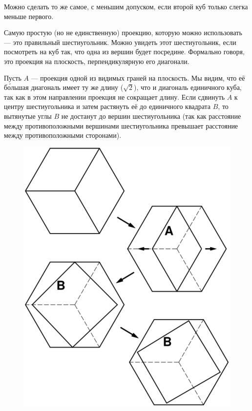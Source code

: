 Можно сделать то же самое, с меньшим допуском, если второй куб только слегка меньше первого.

Самую простую (но не единственную) проекцию, которую можно использовать --- это правильный шестиугольник.
Можно увидеть этот шестиугольник, если посмотреть на куб так, что одна из вершин будет посредине.
Формально говоря, это проекция на плоскость, перпендикулярную его диагонали.

Пусть $A$ --- проекция одной из видимых граней на плоскость.
Мы видим, что её б\'{о}льшая диагональ имеет ту же длину ($\sqrt{2}$), что и диагональ единичного куба, так как в этом направлении проекция не сокращает длину.
Если сдвинуть $A$ к центру шестиугольника и затем растянуть её до единичного квадрата $B$, то вытянутые углы $B$ не достанут до вершин шестиугольника (так как расстояние между противоположными вершинами шестиугольника превышает расстояние между противоположными сторонами).

\begin{figure}[h!]
\centering
\includegraphics[scale=0.7]{Figs/Geometry/pass}
\end{figure}

